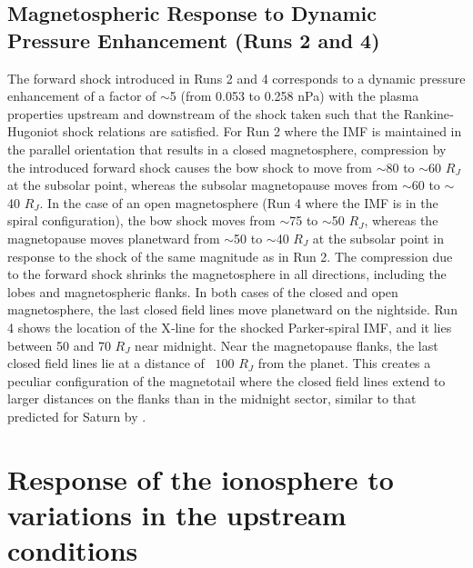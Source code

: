 \subsection{Magnetospheric Response to Dynamic Pressure Enhancement (Runs 2 and 4)}

The forward shock introduced in Runs 2 and 4 corresponds to a dynamic pressure enhancement of a factor of $\sim$5 (from 0.053 to 0.258 nPa) with the plasma properties upstream and downstream of the shock taken such that the Rankine‐Hugoniot shock relations are satisfied. For Run 2 where the IMF is maintained in the parallel orientation that results in a closed magnetosphere, compression by the introduced forward shock causes the bow shock to move from $\sim$80 to $\sim$60 $R_J$ at the subsolar point, whereas the subsolar magnetopause moves from $\sim$60 to $\sim$40 $R_J$. In the case of an open magnetosphere (Run 4 where the IMF is in the spiral configuration), the bow shock moves from $\sim$75 to $\sim$50 $R_J$, whereas the magnetopause moves planetward from $\sim$50 to $\sim$40 $R_J$ at the subsolar point in response to the shock of the same magnitude as in Run 2. The compression due to the forward shock shrinks the magnetosphere in all directions, including the lobes and magnetospheric flanks. In both cases of the closed and open magnetosphere, the last closed field lines move planetward on the nightside. Run 4 shows the location of the X‐line for the shocked Parker‐spiral IMF, and it lies between 50 and 70 $R_J$ near midnight. Near the magnetopause flanks, the last closed field lines lie at a distance of ~$100$ $R_J$ from the planet. This creates a peculiar configuration of the magnetotail where the closed field lines extend to larger distances on the flanks than in the midnight sector, similar to that predicted for Saturn by \cite{Jia2012}.

\section{Response of the ionosphere to variations in the upstream conditions}

